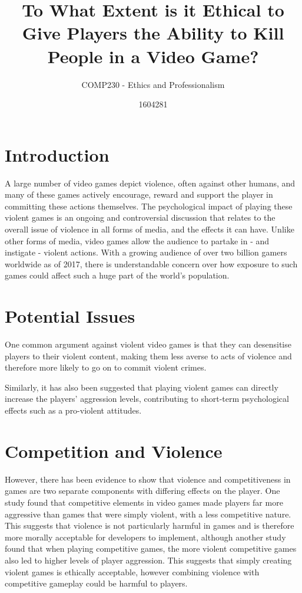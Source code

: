 \documentclass{scrartcl}
\title{To What Extent is it Ethical to Give Players the Ability to Kill People in a Video Game?}
\subtitle{COMP230 - Ethics and Professionalism}
\author{1604281}
\begin{document}
	
	\maketitle
	
	\abstract{}
	
	\section{Introduction}
		A large number of video games depict violence, often against other humans, and many of these games actively encourage, reward and support the player in committing these actions themselves. \cite{esaReport} \cite{violenceStats} The psychological impact of playing these violent games is an ongoing and controversial discussion that relates to the overall issue of violence in all forms of media, and the effects it can have. \cite{UnderstandingScholars} Unlike other forms of media, video games allow the audience to partake in - and instigate - violent actions. With a growing audience of over two billion gamers worldwide as of 2017, there is understandable concern over how exposure to such games could affect such a huge part of the world's population. \cite{numberOfGamers}
		
	
	\section{Potential Issues}
		One common argument against violent video games is that they can desensitise players to their violent content, making them less averse to acts of violence and therefore more likely to go on to commit violent crimes. \cite{devalueViolence} \cite{ExposureLink}
		
		Similarly, it has also been suggested that playing violent games can directly increase the players' aggression levels, contributing to short-term psychological effects such as a pro-violent attitudes. \cite{anderson2007violent}
	
	
	\section{Competition and Violence}
		However, there has been evidence to show that violence and competitiveness in games are two separate components with differing effects on the player. One study found that competitive elements in video games made players far more aggressive than games that were simply violent, with a less competitive nature. \cite{Competativness} This suggests that violence is not particularly harmful in games and is therefore more morally acceptable for developers to implement, although another study found that when playing competitive games, the more violent competitive games also led to higher levels of player aggression. \cite{ViolenceSports} This suggests that simply creating violent games is ethically acceptable, however combining violence with competitive gameplay could be harmful to players.
		
\end{document}
